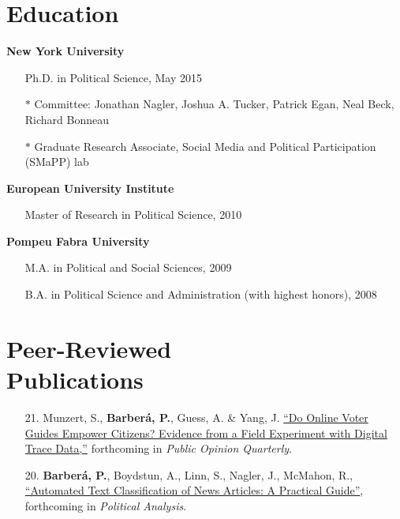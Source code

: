 \documentclass[margin,line,11pt]{resume}
\begin{document}
\begin{resume}
    \section{\mysidestyle Education}
\textbf{New York University}
\begin{itemize}
\item[] Ph.D. in Political Science, May 2015
\vspace{-.15cm}
\item[] $\ast$ Committee: Jonathan Nagler, Joshua A. Tucker, Patrick Egan, Neal Beck, Richard Bonneau
\vspace{-.15cm}
\item[] $\ast$  Graduate Research Associate, Social Media and Political Participation (SMaPP) lab
\end{itemize}
\vspace{-.30cm}
\textbf{European University Institute} 
\begin{itemize}
\item[] Master of Research in Political Science, 2010
\end{itemize}
\vspace{-.30cm}
\textbf{Pompeu Fabra University} 
\begin{itemize}
\item[] M.A. in Political and Social Sciences, 2009
\vspace{-.15cm}
\item[] B.A. in Political Science and Administration (with highest honors), 2008 
\end{itemize}

    \section{\mysidestyle Peer-Reviewed\\Publications}
\vspace{.15cm}    
\begin{itemize}[leftmargin=5.5mm]

\item[21.] Munzert, S., \textbf{Barber\'{a}, P.}, Guess, A. \& Yang, J. \href{https://osf.io/7prz4/}{``Do Online Voter Guides Empower Citizens? Evidence from a Field Experiment with Digital Trace Data,''} forthcoming in \textit{Public Opinion Quarterly}.

\item[20.] \textbf{Barber\'{a}, P.}, Boydstun, A., Linn, S., Nagler, J., McMahon, R.,  \href{https://www.cambridge.org/core/journals/political-analysis/article/automated-text-classification-of-news-articles-a-practical-guide/10462DB284B1CD80C0FAE796AD786BC6}{``Automated Text Classification of News Articles: A Practical Guide''}, forthcoming in \textit{Political Analysis}.


\end{itemize}
\end{resume}
\end{document}
